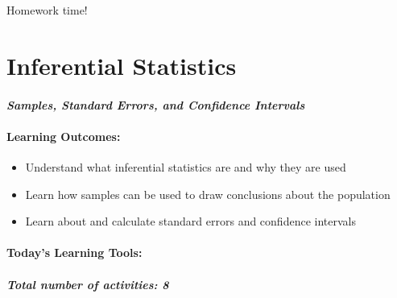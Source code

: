 \documentclass[
]{book}
\providecommand{\tightlist}{%
  \setlength{\itemsep}{0pt}\setlength{\parskip}{0pt}}
\begin{document}
Homework time!

\hypertarget{inferential-statistics}{%
\chapter{Inferential Statistics}\label{inferential-statistics}}

\hypertarget{samples-standard-errors-and-confidence-intervals}{%
\subsubsection*{\texorpdfstring{\emph{Samples, Standard Errors, and Confidence Intervals}}{Samples, Standard Errors, and Confidence Intervals}}\label{samples-standard-errors-and-confidence-intervals}}

\hypertarget{learning-outcomes-4}{%
\subsubsection*{\texorpdfstring{\textbf{Learning Outcomes:}}{Learning Outcomes:}}\label{learning-outcomes-4}}

\begin{itemize}
\tightlist
\item
  Understand what inferential statistics are and why they are used
\item
  Learn how samples can be used to draw conclusions about the population
\item
  Learn about and calculate standard errors and confidence intervals
\end{itemize}

\hypertarget{todays-learning-tools-4}{%
\subsubsection*{\texorpdfstring{\textbf{Today's Learning Tools:}}{Today's Learning Tools:}}\label{todays-learning-tools-4}}

\hypertarget{total-number-of-activities-8-1}{%
\paragraph*{\texorpdfstring{\emph{Total number of activities}: 8}{Total number of activities: 8}}\label{total-number-of-activities-8-1}}
\end{document}
